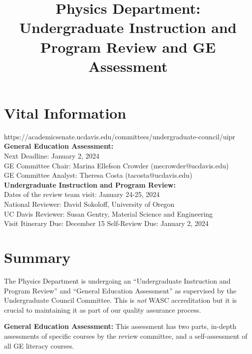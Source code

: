 \documentclass[12pt]{article}
\begin{document}

\title{Physics Department: Undergraduate Instruction and Program Review and GE Assessment}

\maketitle

\section{Vital Information}

https://academicsenate.ucdavis.edu/committees/undergraduate-council/uipr\\

{\bf General Education Assessment:}\\
Next Deadline: January 2, 2024\\
GE Committee Chair: Marina Ellefson Crowder (mecrowder@ucdavis.edu)\\
GE Committee Analyst: Theresa Costa (tacosta@ucdavis.edu)\\

{\bf Undergraduate Instruction and Program Review:}\\
Dates of the review team visit: January 24-25, 2024\\
National Reviewer: David Sokoloff, University of Oregon\\
UC Davis Reviewer: Susan Gentry, Material Science and Engineering\\
Visit Itinerary Due: December 15 
Self-Review Due:  January 2, 2024

\section{Summary}

The Physics Department is undergoing an ``Undergraduate Instruction and Program Review'' and ``General Education Assessment'' as supervised by the Undergraduate Council Committee.  This is {\em not} WASC accreditation but it is crucial to maintaining it as part of our quality assurance process.  

{\bf General Education Assessment:}  This assessment has two parts, in-depth assessments of specific courses by the review committee, and a self-assessment of all GE literacy courses.
\end{document}

